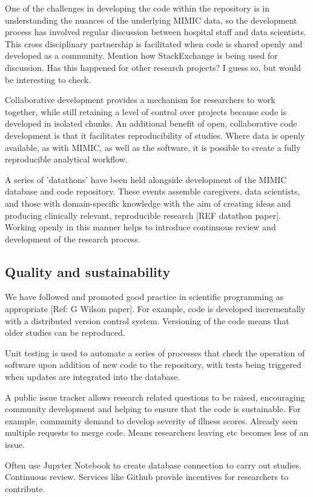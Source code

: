 \documentclass{bioinfo}
\begin{document}
\begin{methods}
One of the challenges in developing the code within the repository is in understanding the nuances of the underlying MIMIC data, so the development process has involved regular discussion between hospital staff and data scientists. This cross disciplinary partnership is facilitated when code is shared openly and developed as a community. Mention how StackExchange is being used for discussion. Has this happened for other research projects? I guess so, but would be interesting to check.

Collaborative development provides a mechanism for researchers to work together, while still retaining a level of control over projects because code is developed in isolated chunks. An additional benefit of open, collaborative code development is that it facilitates reproducibility of studies. Where data is openly available, as with MIMIC, as well as the software, it is possible to create a fully reproducible analytical workflow. 

A series of 'datathons' have been held alongside development of the MIMIC database and code repository. These events assemble caregivers, data scientists, and those with domain-specific knowledge with the aim of creating ideas and producing clinically relevant, reproducible research [REF datathon paper]. Working openly in this manner helps to introduce continuous review and development of the research process. 

\subsection{Quality and sustainability}

We have followed and promoted good practice in scientific programming as appropriate [Ref: G Wilson paper]. For example, code is developed incrementally with a distributed version control system. Versioning of the code means that older studies can be reproduced.

Unit testing is used to automate a series of processes that check the operation of software upon addition of new code to the repository, with tests being triggered when updates are integrated into the database.

A public issue tracker allows research related questions to be raised, encouraging community development and helping to ensure that the code is sustainable. For example, community demand to develop severity of illness scores. Already seen multiple requests to merge code. Means researchers leaving etc becomes less of an issue. 

Often use Jupyter Notebook to create database connection to carry out studies. Continuous review. Services like Github provide incentives for researchers to contribute.

\end{methods}
\end{document}
